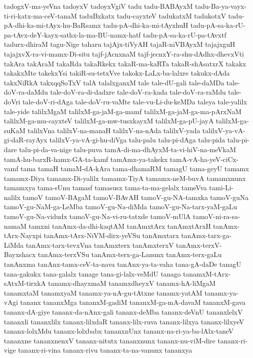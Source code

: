 {tadogxV-ma-yeVna
tadoyxV
tadoyxVgiV
tadu
tadu-BABAyxM
tadu-Ba-ya-vayx-ti-ri-katx-ma-ceV-tanaM
taduBxkatx
tadu-cayxteV
tadukatxM
tadukotxV
tadu-pA-dhi-ka-mi-tAyx-hu-BaRsamx
tadu-pA-dhi-ka-mi-tAyxhuH
tadu-pA-sa-ka-rU-pa-tAvx-deY-kayx-sathx-la-ma-BU-namx-hatf
tadu-pA-sa-ka-rU-pa-tAvxtf
tadurx-dhiraM
tagu-Nige
taharu
tajAjx-tiVyAH
tajaR-niVBAyxM
tajajxguH
tajajxvX-ra-vi-mamx-Di-situ
tajf-jAcnxnaM
tajf-jecnxY-ra-shu-dAdhx-dhevxVti
takAra
takAraM
takaRda
takaRkekx
takaR-ma-kaRTa
takaR-shAsatxrX
takakx
takakxMte
takekxYsi
takiR-su-tetxVve
takokx-LaLx-ba-lalxre
takukx-dAda
takxNiRkA
takxqqSoTxV
talA
talalxganxM
tale
tale-dU-gali
tale-daMDa
tale-doV-ra-daMdu
tale-doV-ra-di-dadxre
tale-doV-ra-kada
tale-doV-ra-raMdu
tale-doVri
tale-doV-ri-dAga
tale-doV-ru-vaMte
tale-vu-Li-du-keMDa
taleya
tale-yalilx
tale-yide
talilxMgaM
talilxM-ga-jaM-ga-mamf
talilxM-ga-jaM-ga-ma-pArxNaM
talilxM-ga-mu-cayxteV
talilxM-ga-mw-tusxkayxM
talilxM-ga-pU-jayA
talilxM-ga-suKaM
talilxVna
talilxV-na-manaH
talilxV-na-nAda
talilxV-yada
talilxV-ya-vA-gi-daR-rayAyx
talilxV-ya-vA-gi-hu-diVga
talu-palu
talu-pi-dAga
talu-pida
talu-pi-dare
talu-pi-da-va-nige
talu-puva
tamA-di-ma-dhAyxM-ta-vi-hiV-na-meVkaM
tamA-hu-barxR-hamx-GA-ta-kamf
tamAmx-ya-takekx
tamA-vA-ha-yeV-ciCx-vamf
tama
tamaH
tamaM-dA-kAra
tama-dhamaRM
tamagU
tama-geyU
tamamx
tamamx-Diya
tamamx-Di-yalilx
tamamx-TiyA
tamamx-neM-buvA
tamamxnunx
tamamxya
tama-sUnu
tamasf
tamasusx
tama-ta-ma-gelalx
tameVva
tami-Li-nalilx
tamoV
tamoV-BAgaM
tamoV-BAvAH
tamoV-gu-NA-tamxka
tamoV-guNa
tamoV-gu-NaM-ga-LeMba
tamoV-gu-Na-diMda
tamoV-gu-Na-tarx-yaM-gaLu
tamoV-gu-Na-vidudx
tamoV-gu-Na-vi-ru-tatxde
tamoV-mUlA
tamoV-ni-ra-sa-namaM
tamxni
tanAmx-da-dhi-kaqtAM
tanAmxtArx
tanAmxtArxH
tanAmx-tArx-Nayxpi
tanAmx-tArx-NiVM-dirx-yeVSu
tanAmxtarx
tanAmx-tarx-ga-LiMda
tanAmx-tarx-tevxVna
tanAmxterx
tanAmxterxV
tanAmx-terxV-Bayxshacx
tanAmx-terxVSu
tanAmx-terx-ga-Lanunx
tanAmx-terx-gaLu
tanAnxma
tanAnx-tamx-ceV-ta-nava
tanAnx-ya-ta-vaha
tana-gA-daDe
tanagU
tana-gakukx
tana-galalx
tanage
tana-gi-lalx-veMdU
tanago
tanamxM-tArx-sAtxM-tirxkA
tanamx-dhayxmaM
tanamxdheyxV
tanamx-hA-liMgaM
tanamxtaM
tanamxyaM
tanamx-ya-nA-gu-tAtxne
tanamx-yatAM
tanamx-ya-vAgi
tananx
tananxMga
tananxM-gadiM
tananxM-ga-mA-davaM
tananxM-gava
tananx-dA-giye
tananx-da-nAnx-gali
tananx-deMba
tananx-deVnU
tananxlelxV
tananxli
tananxlilx
tananx-lilxdaR
tananx-lilx-ruva
tananx-lilxya
tananx-lilxyeV
tananx-lolxMdu
tananx-lolxbabx
tananxnUnx
tananx-na-ri-ya-ba-lAlx-taneV
tananxne
tananxnenxV
tananx-nitutx
tananxnunx
tananx-nu-viM-dire
tananx-ri-vige
tananx-ri-vina
tananx-rivu
tananx-ta-na-vanunx
tananxya
}
